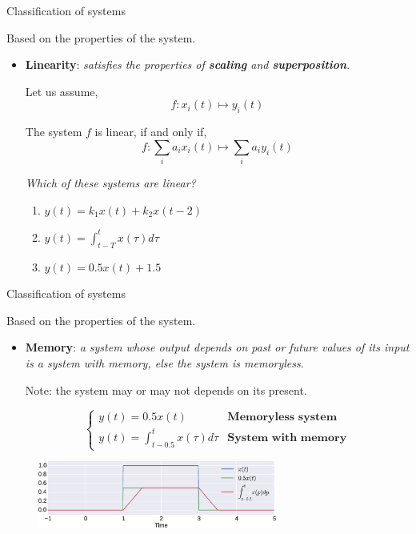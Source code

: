 \documentclass{beamer}
\begin{document}
\begin{frame}{Classification of systems}

Based on the properties of the system.

\begin{itemize}
\item \textbf{Linearity}: \textit{satisfies the properties of \textbf{scaling} and \textbf{superposition}}.

Let us assume, 
\[ f: x_i(t) \mapsto y_i(t) \]

The system $f$ is linear, if and only if,
\[ f:\sum_ia_ix_i(t) \mapsto \sum_ia_iy_i(t) \]

\textit{Which of these systems are linear?}
\begin{enumerate}
\item $y(t) = k_1x(t) + k_2x(t-2)$
\item $y(t) = \int_{t-T}^{t}x(\tau)d\tau$
\item $y(t) = 0.5x(t) + 1.5$
\end{enumerate}
\end{itemize}
\end{frame}

\begin{frame}{Classification of systems}

Based on the properties of the system.

\begin{itemize}
\item \textbf{Memory}: \textit{a system whose output depends on past or future values of its input is a system with memory, else the system is memoryless}. 

Note: the system may or may not depends on its present.

\[ \begin{cases}
y(t) = 0.5x(t) & \mathrm{\textbf{Memoryless system}} \\
y(t) = \int_{t-0.5}^{t}x(\tau)d\tau & \mathrm{\textbf{System with memory}}
\end{cases}
\]
\end{itemize}

\begin{figure}
\includegraphics[width=0.7\textwidth]{img/memory.eps}
\end{figure}

\end{frame}
\end{document}
